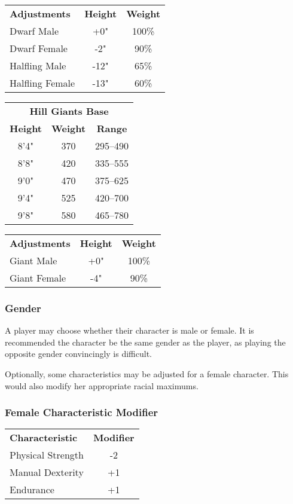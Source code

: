 \begin{multicols*}{3}
\begin{tabular}{lcc}
\textbf{Adjustments} & \textbf{Height} &\textbf{Weight} \\
Dwarf Male	& +0"	& 100\% \\
Dwarf Female	& -2"	& 90\% \\
Halfling Male	& -12"	& 65\% \\
Halfling Female	& -13"	& 60\% \\
\end{tabular}

\begin{tabular}{ccc}
\multicolumn{3}{c}{\textbf{Hill Giants Base}} \\
\textbf{Height} & \textbf{Weight} & \textbf{Range} \\
8'4"	& 370	& 295--490 \\
8'8"	& 420	& 335--555 \\
9'0"	& 470	& 375--625 \\
9'4"	& 525	& 420--700 \\
9'8"	& 580	& 465--780 \\
\end{tabular}

\begin{tabular}{lcc}
\textbf{Adjustments} & \textbf{Height} &\textbf{Weight} \\
Giant Male	& +0"	& 100\% \\
Giant Female	&  -4"	&  90\% \\
\end{tabular}

\subsubsection{Gender}

A player may choose whether their character is male or female. It is
recommended the character be the same gender as the player, as playing
the opposite gender convincingly is difficult.

Optionally, some characteristics may be adjusted for a female
character. This would also modify her appropriate racial maximums.

\subsubsection{Female Characteristic Modifier}

\begin{tabular}{lc}
\textbf{Characteristic} & \textbf{Modifier} \\
Physical Strength 	& -2 \\
Manual Dexterity	& +1 \\
Endurance		& +1 \\
\end{tabular}


\end{multicols*}
